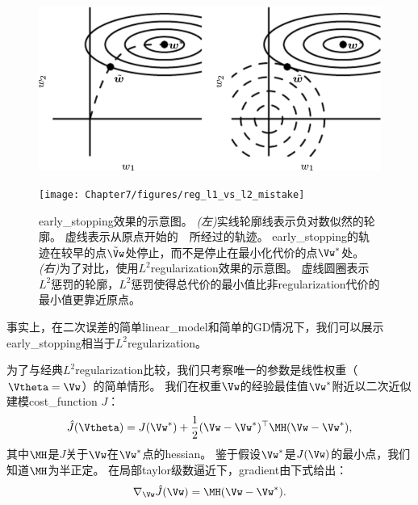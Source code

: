 \begin{figure}[!htb]
\ifOpenSource
\centerline{\includegraphics[scale=0.5]{images/57.png}}
\else
\centerline{\texttt{[image: Chapter7/figures/reg\_l1\_vs\_l2\_mistake]}}
\fi
\caption{\gls{early_stopping}效果的示意图。
\emph{(左)}实线轮廓线表示负对数似然的轮廓。
虚线表示从原点开始的~~所经过的轨迹。 %
\gls{early_stopping}的轨迹在较早的点$\tilde \Vw$处停止，而不是停止在最小化代价的点$\Vw^*$处。
\emph{(右)}为了对比，使用$L^2$\gls{regularization}效果的示意图。
虚线圆圈表示$L^2$惩罚的轮廓，$L^2$惩罚使得总代价的最小值比非\gls{regularization}代价的最小值更靠近原点。
}
\label{fig:chap7_reg_l1_vs_l2_mistake}
\end{figure}

事实上，在二次误差的简单\gls{linear_model}和简单的\gls{GD}情况下，我们可以展示\gls{early_stopping}相当于$L^2$\gls{regularization}。

为了与经典$L^2$\gls{regularization}比较，我们只考察唯一的参数是线性权重（$\Vtheta = \Vw$）的简单情形。
我们在权重$\Vw$的经验最佳值$\Vw^*$附近以二次近似建模\gls{cost_function} $J$：
\begin{align}
 \hat J(\Vtheta) = J(\Vw^*) + \frac{1}{2}  (\Vw- \Vw^*)^\top \MH  (\Vw - \Vw^*),
\end{align}
其中$\MH$是$J$关于$\Vw$在$\Vw^*$点的\gls{hessian}。
鉴于假设$\Vw^*$是$J(\Vw)$的最小点，我们知道$\MH$为半正定。
在局部\gls{taylor}级数逼近下，\gls{gradient}由下式给出：
\begin{align}
 \nabla_{\Vw} \hat J (\Vw) = \MH (\Vw - \Vw^*).
\end{align}


